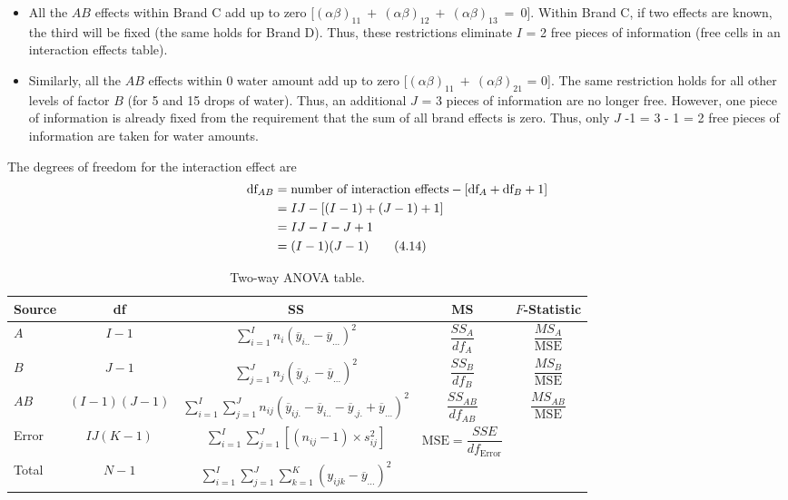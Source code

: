 \documentclass[
]{report}
\begin{document}
\begin{itemize}
\item All the $\scriptstyle AB$ effects within Brand C add up to zero [$\scriptstyle (\alpha\beta)_{11} \ +\  (\alpha\beta)_{12} \ +\  (\alpha\beta)_{13} \ =\  0$]. Within Brand C, if two effects are known, the third will be fixed (the same holds for Brand D). Thus, these restrictions eliminate $\scriptstyle I$ = 2 free pieces of information (free cells in an interaction effects table).
\item  Similarly, all the $\scriptstyle AB$ effects within 0 water amount add up to zero [$\scriptstyle (\alpha\beta)_{11} \ +\  (\alpha\beta)_{21}$ = 0]. The same restriction holds for all other levels of factor $\scriptstyle B$ (for 5 and 15 drops of water). Thus, an additional $\scriptstyle J$ = 3 pieces of information are no longer free. However, one piece of information is already fixed from the requirement that the sum of all brand effects is zero. Thus, only $\scriptstyle J$ -1 = 3 - 1 = 2 free pieces of information are taken for water amounts.
\end {itemize}

The degrees of freedom for the interaction effect are
\begin{align}\label{4.14}
\text{df}_{AB} &= \text{number of interaction effects} - [\text{df}_A + \text{df}_B + 1] \notag \\
&= IJ - [(I-1) + (J-1) + 1] \notag \\
&= IJ - I - J + 1 \notag \\
&= (I-1)(J-1)
\tag{4.14}
\end{align}

\begin{table}[!h]
\centering
\caption{\label{tab:tab48}Two-way ANOVA table.}
\centering
\begin{tabular}[t]{lcccc}
\toprule
Source & df & SS & MS & $F$-Statistic\\
\midrule
$A$ & $I - 1$ & $\displaystyle\sum_{i=1}^{I} n_i (\overline{y}_{i..} - \overline{y}_{...})^2$ & $\dfrac{SS_A}{df_A}$ & $\dfrac{MS_A}{\text{MSE}}$\\
$B$ & $J - 1$ & $\displaystyle\sum_{j=1}^{J} n_j (\overline{y}_{.j.} - \overline{y}_{...})^2$ & $\dfrac{SS_B}{df_B}$ & $\dfrac{MS_B}{\text{MSE}}$\\
$AB$ & $(I-1)(J-1)$ & $\displaystyle\sum_{i=1}^{I}\sum_{j=1}^{J} n_{ij}(\overline{y}_{ij.} - \overline{y}_{i..} - \overline{y}_{.j.} + \overline{y}_{...})^2$ & $\dfrac{SS_{AB}}{df_{AB}}$ & $\dfrac{MS_{AB}}{\text{MSE}}$\\
Error & $IJ(K-1)$ & $\displaystyle\sum_{i=1}^I\sum_{j=1}^J [(n_{ij} - 1) \times s^2_{ij}]$ & $\text{MSE} = \dfrac{SSE}{df_{\text{Error}}}$ & \\
Total & $N-1$ & $\displaystyle\sum_{i=1}^I\sum_{j=1}^J\sum_{k=1}^K (y_{ijk} - \overline{y}_{...})^2$ &  & \\
\bottomrule
\end{tabular}
\end{table}
\end{document}
